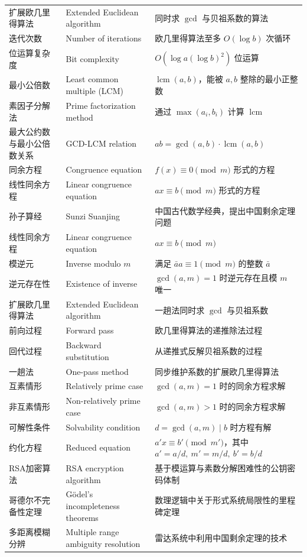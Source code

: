 \documentclass[UTF8,11pt,a4paper]{ctexbook}   %
\theoremstyle{definition}
\DeclareMathOperator{\lcm}{lcm}
\begin{document}
\begin{longtable}{|p{4.8cm}|p{4.8cm}|p{4.8cm}|}
扩展欧几里得算法 & Extended Euclidean algorithm & 同时求 $\gcd$ 与贝祖系数的算法 \\
迭代次数 & Number of iterations & 欧几里得算法至多 $O(\log b)$ 次循环 \\
位运算复杂度 & Bit complexity & $O(\log a(\log b)^2)$ 位运算 \\
最小公倍数 & Least common multiple (LCM) & $\lcm(a,b)$，能被 $a,b$ 整除的最小正整数 \\
素因子分解法 & Prime factorization method & 通过 $\max(a_i,b_i)$ 计算 $\lcm$ \\
最大公约数与最小公倍数关系 & GCD-LCM relation & $ab=\gcd(a,b)\cdot\lcm(a,b)$ \\
同余方程 & Congruence equation & $f(x)\equiv 0\pmod m$ 形式的方程 \\
线性同余方程 & Linear congruence equation & $ax\equiv b\pmod m$ 形式的方程 \\
孙子算经 & Sunzi Suanjing & 中国古代数学经典，提出中国剩余定理问题 \\
\hline
线性同余方程 & Linear congruence equation & $ax\equiv b\pmod m$ \\
模逆元 & Inverse modulo $m$ & 满足 $\bar{a}a\equiv 1\pmod m$ 的整数 $\bar{a}$ \\
逆元存在性 & Existence of inverse & $\gcd(a,m)=1$ 时逆元存在且模 $m$ 唯一 \\
扩展欧几里得算法 & Extended Euclidean algorithm & 一趟法同时求 $\gcd$ 与贝祖系数 \\
前向过程 & Forward pass & 欧几里得算法的递推除法过程 \\
回代过程 & Backward substitution & 从递推式反解贝祖系数的过程 \\
一趟法 & One-pass method & 同步维护系数的扩展欧几里得算法 \\
互素情形 & Relatively prime case & $\gcd(a,m)=1$ 时的同余方程求解 \\
非互素情形 & Non-relatively prime case & $\gcd(a,m)>1$ 时的同余方程求解 \\
可解性条件 & Solvability condition & $d=\gcd(a,m)\mid b$ 时方程有解 \\
约化方程 & Reduced equation & $a'x\equiv b'\pmod{m'}$，其中 $a'=a/d,\ m'=m/d,\ b'=b/d$ \\
RSA加密算法 & RSA encryption algorithm & 基于模运算与素数分解困难性的公钥密码体制 \\
哥德尔不完备性定理 & Gödel's incompleteness theorems & 数理逻辑中关于形式系统局限性的里程碑定理 \\
多距离模糊分辨 & Multiple range ambiguity resolution & 雷达系统中利用中国剩余定理的技术 \\

\end{longtable}
\end{document}
